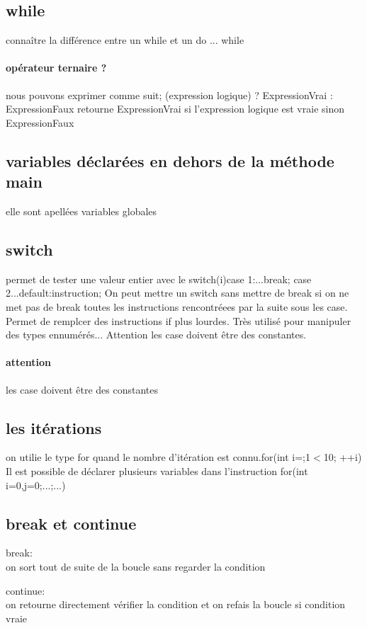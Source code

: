\documentclass[a4paper,10pt]{article}
\begin{document}
\subsection{while}
connaître la différence entre un while et un do ... while
\paragraph{opérateur ternaire ?}
nous pouvons exprimer comme suit; (expression logique) ? ExpressionVrai : ExpressionFaux
\newline
retourne ExpressionVrai si l'expression logique est vraie sinon ExpressionFaux
\subsection{variables déclarées en dehors de la méthode main}
elle sont apellées variables globales
\subsection{switch}
permet de tester une valeur entier avec le switch(i){case 1:...break; case 2...default:instruction;} On peut mettre un switch sans mettre de break si on ne met pas de break toutes les instructions rencontréees par la suite sous les case.
Permet de remplcer des instructions if plus lourdes. Très utilisé pour manipuler des types ennumérés... Attention les case doivent être des constantes.
\paragraph{attention}
les case doivent être des constantes
\subsection{les itérations}
on utilie le type for quand le nombre d'itération est connu.for(int i=;1$<$10; ++i){} Il est possible de déclarer plusieurs variables dans l'instruction for(int i=0,j=0;...;...)
\subsection{break et continue}
\begin{description}
 \item break:\\{on sort tout de suite de la boucle sans regarder la condition}
 \item continue:\\{on retourne directement vérifier la condition et on refais la boucle si condition vraie}
\end{description}
\end{document}
